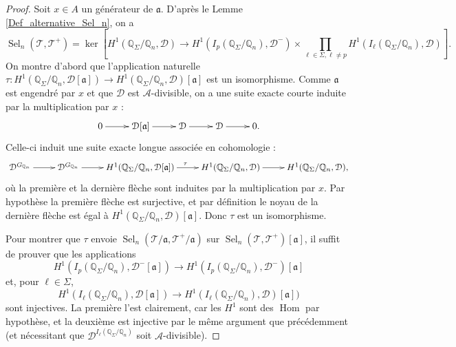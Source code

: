 \documentclass[12pt]{amsart}
\newcommand\bQ{\mathbb{Q}}
\newcommand\cA{\mathcal{A}}
\newcommand\cD{\mathcal{D}}
\newcommand\cT{\mathcal{T}}
\newcommand\ga{\mathfrak{a}}
\DeclareMathOperator{\Hom}{Hom}
\DeclareMathOperator{\Sel}{Sel}
\theoremstyle{defstyle}
\theoremstyle{thmstyle}
\begin{document}
\begin{proof}
	Soit $x\in A$ un générateur de $\ga$. D'après le Lemme \ref{Def_alternative_Sel_n}, on a 
	$$
	\Sel_n(\cT,\cT^+)=\ker \left[ H^1(\bQ_{\Sigma}/\bQ_n,\cD) \longrightarrow H^1(I_{p}(\bQ_{\Sigma}/\bQ_n),\cD^-) \times \prod_{\ell \in \Sigma,\ell\neq p} H^1(I_{\ell}(\bQ_\Sigma/\bQ_n),\cD)  \right].
	$$
	On montre d'abord que l'application naturelle $\tau:H^1(\bQ_{\Sigma}/\bQ_n,\cD[\ga]) \longrightarrow H^1(\bQ_{\Sigma}/\bQ_n,\cD)[\ga]$ est un isomorphisme. Comme $\ga$ est engendré par $x$ et que $\cD$ est $\cA$-divisible, on a une suite exacte courte induite par la multiplication par $x$ :
	$$\xymatrix{ 0 \ar[r] & \cD[\ga] \ar[r] & \cD \ar[r] & \cD \ar[r] &  0. }$$
	Celle-ci induit une suite exacte longue associée en cohomologie :
	$$\xymatrix{ \cD^{G_{\bQ_n}} \ar[r] & \cD^{G_{\bQ_n}} \ar[r] & H^1(\bQ_{\Sigma}/\bQ_n,\cD[\ga]) \ar[r]^{\tau} & H^1(\bQ_{\Sigma}/\bQ_n,\cD) \ar[r] &  H^1(\bQ_{\Sigma}/\bQ_n,\cD), }$$
	où la première et la dernière flèche sont induites par la multiplication par $x$. Par hypothèse la première flèche est surjective, et par définition le noyau de la dernière flèche est égal à $H^1(\bQ_{\Sigma}/\bQ_n,\cD)[\ga]$. Donc $\tau$ est un isomorphisme. 
	
	Pour montrer que $\tau$ envoie $\Sel_n(\cT/\ga,\cT^+/\ga)$ sur $\Sel_n(\cT,\cT^+)[\ga]$, il suffit de prouver que les applications 
	$$ H^1(I_{p}(\bQ_{\Sigma}/\bQ_n),\cD^-[\ga]) \longrightarrow H^1(I_{p}(\bQ_{\Sigma}/\bQ_n),\cD^-)[\ga]$$
	et, pour $\ell\in \Sigma$,
	$$ H^1(I_{\ell}(\bQ_\Sigma/\bQ_n),\cD[\ga]) \longrightarrow H^1(I_{\ell}(\bQ_\Sigma/\bQ_n),\cD)[\ga])$$
	sont injectives. La première l'est clairement, car les $H^1$ sont des $\Hom$ par hypothèse, et la deuxième est injective par le même argument que précédemment (et nécessitant que $\cD^{I_\ell(\bQ_\Sigma/\bQ_n)}$ soit $\cA$-divisible).
\end{proof}
\end{document}
